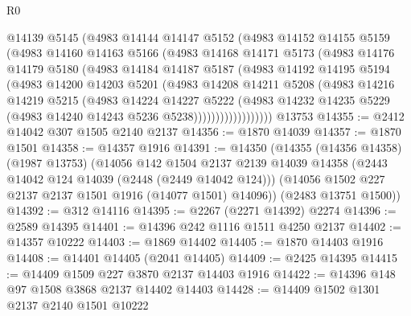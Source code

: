 \begin{lexlean}{R0}
\begin{coremodule}
              @14139
              @5145
              (@4983
                @14144
                @14147
                @5152
                (@4983
                  @14152
                  @14155
                  @5159
                  (@4983
                    @14160
                    @14163
                    @5166
                    (@4983
                      @14168
                      @14171
                      @5173
                      (@4983
                        @14176
                        @14179
                        @5180
                        (@4983
                          @14184
                          @14187
                          @5187
                          (@4983
                            @14192
                            @14195
                            @5194
                            (@4983
                              @14200
                              @14203
                              @5201
                              (@4983
                                @14208
                                @14211
                                @5208
                                (@4983
                                  @14216
                                  @14219
                                  @5215
                                  (@4983
                                    @14224
                                    @14227
                                    @5222
                                    (@4983
                                      @14232
                                      @14235
                                      @5229
                                      (@4983 @14240 @14243 @5236 @5238))))))))))))))))))
    @13753
@14355 := @2412 @14042 @307 @1505 @2140 @2137
@14356 := @1870 @14039
@14357 := @1870 @1501
@14358 := @14357 @1916
@14391 := @14350
    (@14355
      (@14356 @14358)
      (@1987 @13753)
      (@14056
        @142
        @1504
        @2137
        @2139
        @14039
        @14358
        (@2443 @14042 @124 @14039 (@2448 (@2449 @14042 @124)))
        (@14056 @1502 @227 @2137 @2137 @1501 @1916 (@14077 @1501) @14096))
      (@2483 @13751 @1500))
@14392 := @312 @14116
@14395 := @2267 (@2271 @14392) @2274
@14396 := @2589 @14395
@14401 := @14396 @242 @1116 @1511 @4250 @2137
@14402 := @14357 @10222
@14403 := @1869 @14402
@14405 := @1870 @14403 @1916
@14408 := @14401 @14405 (@2041 @14405)
@14409 := @2425 @14395
@14415 := @14409 @1509 @227 @3870 @2137 @14403 @1916
@14422 := @14396 @148 @97 @1508 @3868 @2137 @14402 @14403
@14428 := @14409 @1502 @1301 @2137 @2140 @1501 @10222

\end{coremodule}
\end{lexlean}
